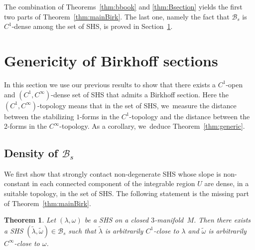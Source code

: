 \documentclass[11pt]{article}
\newcommand{\threemanifold}{$3$\nobreakdash-mani\-fold\xspace}
\newtheorem{theorem}{Theorem}[section]
\theoremstyle{definition}
\begin{document}
The combination of Theorems~\ref{thm:bbook} and \ref{thm:Bsection} yields the first two parts of Theorem~\ref{thm:mainBirk}. The last one, namely the fact that $\mathcal{B}_s$ is $C^1$-dense among the set of SHS, is proved in Section~\ref{sec:gen}.\enlargethispage{.5\baselineskip}%

\section{Genericity of Birkhoff sections}\label{sec:gen}

In this section we use our previous results to show that there exists a $C^1$-open and $(C^1,C^\infty)$-dense set of SHS that admits a Birkhoff section. Here the $(C^1,C^\infty)$-topology means that in the set of SHS, we~measure the distance between the stabilizing $1$-forms in the $C^1$-topology and the distance between the 2-forms in the $C^\infty$-topology. As a corollary, we~deduce Theorem~\ref{thm:generic}.

\subsection{Density of $\mathcal{B}_s$
}\label{ss:density}

We first show that strongly contact non-degenerate SHS whose slope is non-constant in each connected component of the integrable region $U$ are dense, in a suitable topology, in the set of SHS. The following statement is the missing part of Theorem~\ref{thm:mainBirk}.

\begin{theorem}\label{thm:density}
Let $(\lambda,\omega)$ be a SHS on a closed \threemanifold~$M$. Then there exists a SHS $(\widetilde \lambda, \widetilde \omega) \in \mathcal{B}_s$ such that $\widetilde \lambda$ is arbitrarily $C^1$-close to $\lambda$ and $\widetilde \omega$ is arbitrarily $C^\infty$-close to $\omega$.
\end{theorem}
\end{document}
